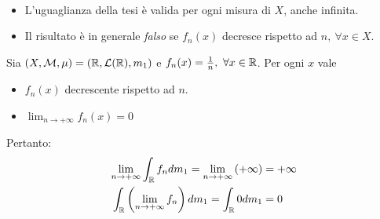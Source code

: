 \begin{observes}~{}
	\begin{itemize}
		\item L'uguaglianza della tesi è valida per ogni misura di $X$, anche infinita.
		\item Il risultato è in generale \textit{falso} se $f_n(x)$ decresce rispetto ad $n,\ \forall x\in X$.
	\end{itemize}
\end{observes}
\begin{examplewt}
	Sia $\left(X,\mathcal{M},\mu\right)=\left(\mathbb{R},\mathcal{L}(\mathbb{R}),m_1\right)$ e $f_n(x)=\frac{1}{n},\ \forall x\in\mathbb{R}$. Per ogni $x$ vale
	\begin{itemize}
		\item $f_n(x)$ decrescente rispetto ad $n$.
		\item $\displaystyle\lim_{n\to+\infty}f_n(x)=0$
	\end{itemize}
Pertanto:
\begin{align*}
	\lim_{n\to+\infty}\int_{\mathbb{R}}f_ndm_1=\lim_{n\to+\infty}\left(+\infty\right)&=+\infty\\
	\int_{\mathbb{R}}\left(\lim_{n\to+\infty}f_n\right)dm_1=\int_{\mathbb{R}}0dm_1&=0
\end{align*}
\end{examplewt}
